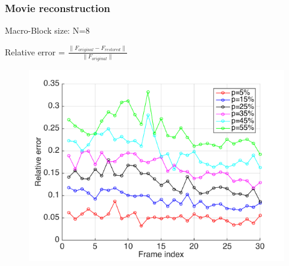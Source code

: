 \documentclass{beamer}
\begin{document}
\begin{frame}
\frametitle{Movie reconstruction}
Macro-Block size: N=8
\begin{center}
\end{center}
\end{frame}

\begin{frame}
Relative error = $\frac{\| F_{original}-F_{restored} \|}{\|F_{original} \|}$
\begin{figure}
\includegraphics[width=0.7\linewidth]{pEffectPlot}
\end{figure}
\end{frame}
\end{document}

